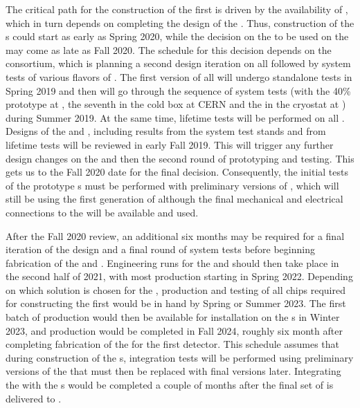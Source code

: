 The critical path for the construction of the first 
  is driven by the availability of ,
which in turn depends on completing the design of the
. Thus, construction
of the s could start as early as Spring 2020, while the
decision on the  to be used on the 
may come as late as Fall 2020. The schedule for this decision
depends on the  consortium, which is
planning a second design iteration on all 
followed by system tests of various flavors of .
The first version of all  will undergo
standalone tests in Spring 2019 and then will go through the 
sequence of system tests (with the 40\%  prototype at ,
the seventh   in the cold box at CERN
and the  in the  cryostat at )
during Summer 2019. At the same time, lifetime tests will be performed 
on all . Designs of the  and , including results
from the system test stands and from lifetime tests will be reviewed
in early Fall 2019. This will trigger any further design
changes on the  and then the second round of prototyping
and testing. This gets us to the Fall 2020 date for the final
 decision. Consequently, the initial
tests of the  prototype s must be performed
with preliminary versions of , which will still be using
the first generation of  although the final 
mechanical and electrical connections to the  will be available and used.

After the Fall 2020 review, an additional six months may be 
required for a final iteration of the  design
and a final round of system tests before beginning fabrication
of the  and . Engineering runs
for the  and  should then take place in the
second half of 2021, with most production starting in
Spring 2022. Depending on which solution is chosen for the
, production and testing of all chips required
for constructing the first   
would be in hand by Spring or Summer 2023. The first batch of
production  would then be available for installation on
the s in Winter 2023, and production would be
completed in Fall 2024, roughly six month after completing
fabrication of the  for the first detector.
This schedule assumes that during construction of the 
s, integration tests will be performed using preliminary
versions of the  that must then be replaced
with final versions later. Integrating the 
with the s would be completed a couple of months after
the final set of  is delivered to .

